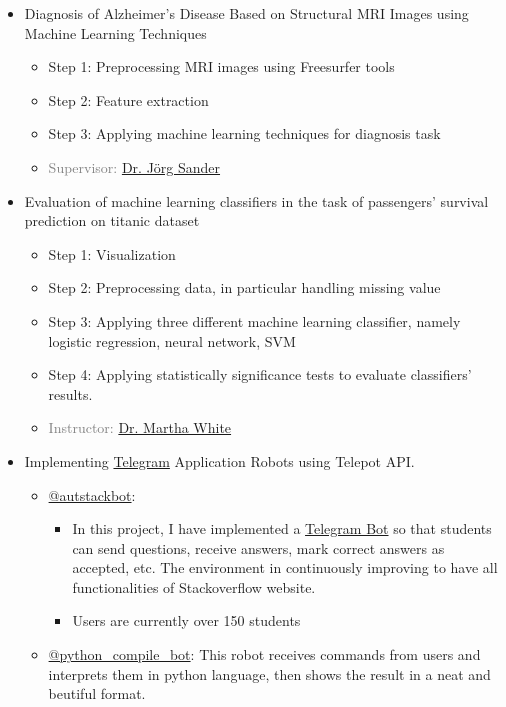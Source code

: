 \begin{itemize}
\begin{itemize}
		\item Diagnosis of Alzheimer’s Disease Based on Structural MRI Images using Machine Learning Techniques
		\begin{itemize}
			\item Step 1: Preprocessing MRI images using Freesurfer tools
			\item Step 2: Feature extraction
			\item Step 3: Applying machine learning techniques for diagnosis task
			\item \textcolor{gray}{Supervisor: \href{http://webdocs.cs.ualberta.ca/~joerg/}{Dr. Jörg Sander}}
			
		\end{itemize}
		
		\item Evaluation of machine learning classifiers in the task of passengers' survival prediction on titanic dataset
		\begin{itemize}
			\item Step 1: Visualization
			\item Step 2: Preprocessing data, in particular handling missing value
			\item Step 3: Applying three different machine learning classifier, namely logistic regression, neural network, SVM
			\item Step 4: Applying statistically significance tests to evaluate classifiers' results.
			\item \textcolor{gray}{Instructor: \href{http://webdocs.cs.ualberta.ca/~whitem/}{Dr. Martha White}}
		\end{itemize}
		\item Implementing \href{https://telegram.org/}{Telegram} Application Robots using Telepot API.
		\begin{itemize}
			\item \href{https://telegram.me/autstackbot}{@autstackbot}:
			\begin{itemize}
				\item In this project, I have implemented a \href{https://telegram.org/blog/bot-revolution}{Telegram Bot} so that students can send questions, receive answers, mark correct answers as accepted, etc. The environment in continuously improving to have all functionalities of Stackoverflow website.
				\item Users are currently over 150 students
			\end{itemize}
			\item \href{https://telegram.me/python_compile_bot}{@python\_compile\_bot}: This robot receives commands from users and interprets them in python language, then shows the result in a neat and beutiful format.
		\end{itemize}
		

\end{itemize}
\end{itemize}
